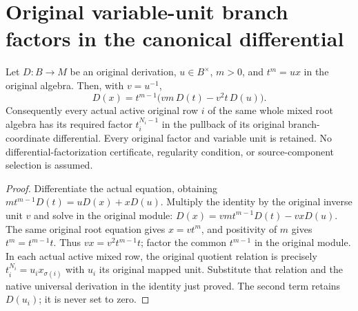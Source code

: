 \section{Original variable-unit branch factors in the canonical differential}

\begin{lemma}
\label{lem:kn-global-trace-native-root-differential-factor}
\leanok
Let $D:B\to M$ be an original derivation, $u\in B^\times$, $m>0$, and
$t^m=ux$ in the original algebra.  Then, with $v=u^{-1}$,
\[
 D(x)=t^{m-1}\bigl(vm\,D(t)-v^2t\,D(u)\bigr).
\]
Consequently every actual active original row $i$ of the same whole mixed
root algebra has its required factor $t_i^{N_i-1}$ in the pullback of
its original branch-coordinate differential.  Every original factor and
variable unit is retained.  No differential-factorization certificate,
regularity condition, or source-component selection is assumed.
\end{lemma}
\begin{proof}
Differentiate the actual equation, obtaining
$m t^{m-1}D(t)=uD(x)+xD(u)$.  Multiply the identity by the original
inverse unit $v$ and solve in the original module:
$D(x)=vm t^{m-1}D(t)-vxD(u)$.
The same original root equation gives $x=vt^m$, and positivity of $m$
gives $t^m=t^{m-1}t$.  Thus $vx=v^2t^{m-1}t$; factor the common
$t^{m-1}$ in the original module.  In each actual active mixed row,
the original quotient relation is precisely
$t_i^{N_i}=u_i x_{\sigma(i)}$ with $u_i$ its original mapped unit.
Substitute that relation and the native universal derivation in the
identity just proved.  The second term retains $D(u_i)$; it is never
set to zero.
\end{proof}
